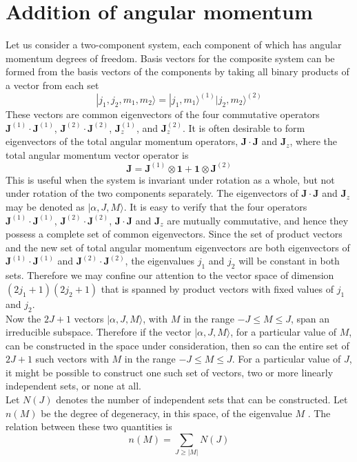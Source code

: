 \section{Addition of angular momentum}
Let us consider a two-component system, each component of which has angular momentum degrees of freedom. Basis vectors for the composite system can be formed from the basis vectors of the components by taking all binary products of a vector from each set
\[|j_1,j_2,m_1,m_2\rangle = |j_1,m_1\rangle ^{(1)} |j_2,m_2\rangle ^{(2)}\]
These vectors are common eigenvectors of the four commutative operators $\bm{J}^{(1)}\cdot\bm{J}^{(1)}$, $\bm{J}^{(2)}\cdot\bm{J}^{(2)}$, $\bm{J}_z^{(1)}$, and $\bm{J}_z^{(2)}$.
It is often desirable to form eigenvectors of the total angular momentum operators, $\bm{J}\cdot\bm{J}$ and $\bm{J}_z$, where the total angular momentum vector operator is
\[\bm{J} = \bm{J}^{(1)}\otimes\bm{1} + \bm{1}\otimes\bm{J}^{(2)}\]
This is useful when the system is invariant under rotation as a whole, but not under rotation of the two components separately. 
The eigenvectors of $\bm{J}\cdot\bm{J}$ and $\bm{J}_z$ may be denoted as $|\alpha, J, M \rangle$. It is easy to verify that the four operators $\bm{J}^{(1)}\cdot\bm{J}^{(1)}$, $\bm{J}^{(2)}\cdot\bm{J}^{(2)}$, $\bm{J}\cdot\bm{J}$ and $\bm{J}_z$ are mutually commutative, and hence they possess a complete set of common eigenvectors. 
Since the set of product vectors and the new set of total angular momentum eigenvectors are both eigenvectors of $\bm{J}^{(1)}\cdot\bm{J}^{(1)}$ and $\bm{J}^{(2)}\cdot\bm{J}^{(2)}$, the eigenvalues $j_1$ and $j_2$ will be constant in both sets. Therefore
we may confine our attention to the vector space of dimension $(2j_1+1)(2j_2+1)$ that is spanned by product vectors with fixed values of $j_1$ and $j_2$.\\
Now the $2J+1$ vectors $|\alpha, J, M \rangle$, with $M$ in the range $-J \leq M \leq J$, span an irreducible subspace.
Therefore if the vector $|\alpha, J, M \rangle$, for a particular value of $M$, can be constructed in the space under consideration, then so can the entire set of $2J+1$
such vectors with $M$ in the range $-J \leq M \leq J$.
For a particular value of $J$, it might be possible to construct one such set of vectors, two or more linearly independent sets, or none at all. \\
Let $N(J)$ denotes the number of independent sets that can be constructed. Let $n(M)$ be the degree of degeneracy, in this space, of the eigenvalue $M$ . The relation between these two quantities is
\[n(M) = \sum_{J \geq |M|} N(J)\]
